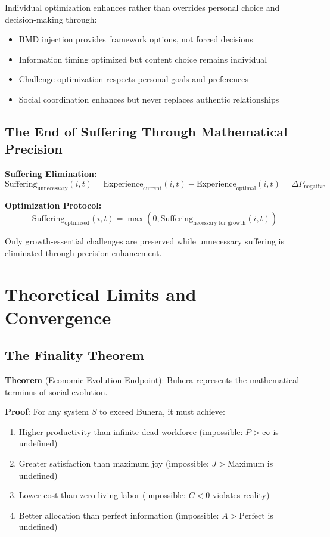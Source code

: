 \documentclass[12pt,a4paper]{article}
\begin{document}
Individual optimization enhances rather than overrides personal choice and decision-making through:
\begin{itemize}
\item BMD injection provides framework options, not forced decisions
\item Information timing optimized but content choice remains individual
\item Challenge optimization respects personal goals and preferences
\item Social coordination enhances but never replaces authentic relationships
\end{itemize}

\subsection{The End of Suffering Through Mathematical Precision}

\textbf{Suffering Elimination:}
\begin{equation}
\text{Suffering}_{\text{unnecessary}}(i,t) = \text{Experience}_{\text{current}}(i,t) - \text{Experience}_{\text{optimal}}(i,t) = \Delta P_{\text{negative}}
\end{equation}

\textbf{Optimization Protocol:}
\begin{equation}
\text{Suffering}_{\text{optimized}}(i,t) = \max(0, \text{Suffering}_{\text{necessary for growth}}(i,t))
\end{equation}

Only growth-essential challenges are preserved while unnecessary suffering is eliminated through precision enhancement.

\section{Theoretical Limits and Convergence}

\subsection{The Finality Theorem}

\textbf{Theorem} (Economic Evolution Endpoint): Buhera represents the mathematical terminus of social evolution.

\textbf{Proof}: For any system $S$ to exceed Buhera, it must achieve:
\begin{enumerate}
\item Higher productivity than infinite dead workforce (impossible: $P > \infty$ is undefined)
\item Greater satisfaction than maximum joy (impossible: $J > \text{Maximum}$ is undefined)
\item Lower cost than zero living labor (impossible: $C < 0$ violates reality)
\item Better allocation than perfect information (impossible: $A > \text{Perfect}$ is undefined)
\end{enumerate}
\end{document}
